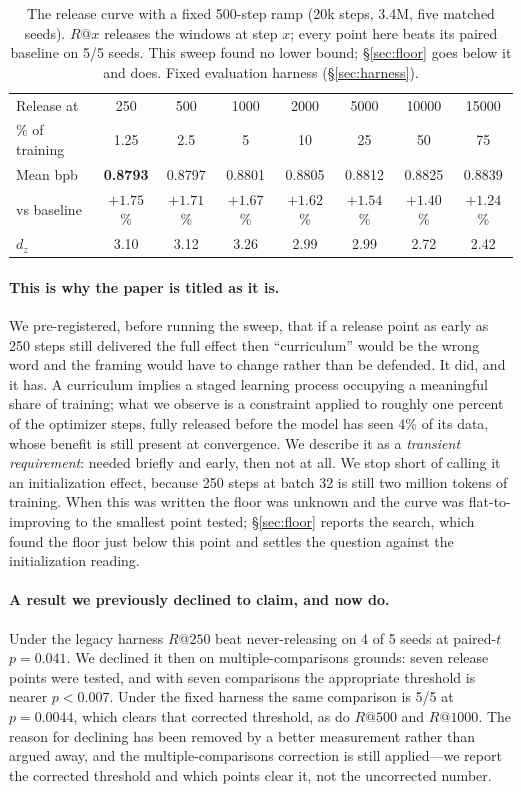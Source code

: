 \documentclass[11pt,a4paper]{article}
\begin{document}
\begin{table}[H]
\centering
\caption{The release curve with a fixed 500-step ramp (20k steps, 3.4M, five matched seeds). $R@x$ releases the windows at step $x$; every point here beats its paired baseline on 5/5 seeds. This sweep found no lower bound; \S\ref{sec:floor} goes below it and does. Fixed evaluation harness (\S\ref{sec:harness}).}
\label{tab:releasefull}
\begin{tabular}{lccccccc}
\toprule
Release at & 250 & 500 & 1000 & 2000 & 5000 & 10000 & 15000 \\
\% of training & 1.25 & 2.5 & 5 & 10 & 25 & 50 & 75 \\
\midrule
Mean bpb & \textbf{0.8793} & 0.8797 & 0.8801 & 0.8805 & 0.8812 & 0.8825 & 0.8839 \\
vs baseline & $\mathbf{+1.75}$\% & $+1.71$\% & $+1.67$\% & $+1.62$\% & $+1.54$\% & $+1.40$\% & $+1.24$\% \\
$d_z$ & 3.10 & 3.12 & 3.26 & 2.99 & 2.99 & 2.72 & 2.42 \\
\bottomrule
\end{tabular}
\end{table}

\paragraph{This is why the paper is titled as it is.} We pre-registered, before running the sweep, that if a release point as early as 250 steps still delivered the full effect then ``curriculum'' would be the wrong word and the framing would have to change rather than be defended. It did, and it has. A curriculum implies a staged learning process occupying a meaningful share of training; what we observe is a constraint applied to roughly one percent of the optimizer steps, fully released before the model has seen 4\% of its data, whose benefit is still present at convergence. We describe it as a \emph{transient requirement}: needed briefly and early, then not at all. We stop short of calling it an initialization effect, because 250 steps at batch 32 is still two million tokens of training. When this was written the floor was unknown and the curve was flat-to-improving to the smallest point tested; \S\ref{sec:floor} reports the search, which found the floor just below this point and settles the question against the initialization reading.

\paragraph{A result we previously declined to claim, and now do.} Under the legacy harness $R@250$ beat never-releasing on 4 of 5 seeds at paired-$t$ $p=0.041$. We declined it then on multiple-comparisons grounds: seven release points were tested, and with seven comparisons the appropriate threshold is nearer $p<0.007$. Under the fixed harness the same comparison is 5/5 at $p=0.0044$, which clears that corrected threshold, as do $R@500$ and $R@1000$. The reason for declining has been removed by a better measurement rather than argued away, and the multiple-comparisons correction is still applied---we report the corrected threshold and which points clear it, not the uncorrected number.
\end{document}
